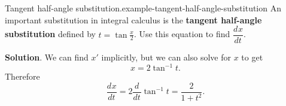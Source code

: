 \documentclass[10pt,]{book}
\newcommand{\terminology}[1]{\textbf{#1}}
\numberwithin{equation}{section}
\newcommand{\dv}[3][]{\dfrac{d^{#1} #2}{d #3^{#1}}}
\begin{document}
\begin{example}{Tangent half-angle substitution.}{example-tangent-half-angle-substitution}%
\hypertarget{p-280}{}%
An important substitution in integral calculus is the \terminology{tangent half-angle substitution} defined by \(t = \tan\frac{x}{2}\). Use this equation to find \(\dv{x}{t}\).%
\par\smallskip%
\noindent\textbf{Solution}.\hypertarget{solution-61}{}\quad%
\hypertarget{p-281}{}%
We can find \(x'\) implicitly, but we can also solve for \(x\) to get%
\begin{equation*}
x = 2\tan^{-1}t.
\end{equation*}
Therefore%
\begin{equation*}
\dv{x}{t} = 2\dv{}{t}\tan^{-1}t = \frac{2}{1+t^{2}}.
\end{equation*}
%
\end{example}
%
%
\typeout{************************************************}
\typeout{************************************************}
%
\end{document}
